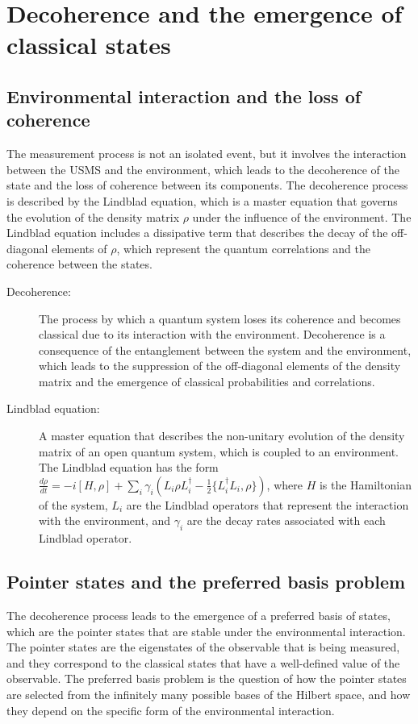 \section{Decoherence and the emergence of classical states}
\subsection{Environmental interaction and the loss of coherence}
The measurement process is not an isolated event, but it involves the interaction between the USMS and the environment, which leads to the decoherence of the state and the loss of coherence between its components. The decoherence process is described by the Lindblad equation, which is a master equation that governs the evolution of the density matrix $\rho$ under the influence of the environment. The Lindblad equation includes a dissipative term that describes the decay of the off-diagonal elements of $\rho$, which represent the quantum correlations and the coherence between the states.

\begin{tcolorbox}[colback=blue!5!white,colframe=blue!75!black,title=New terms]
\begin{description}
\item[Decoherence:] The process by which a quantum system loses its coherence and becomes classical due to its interaction with the environment. Decoherence is a consequence of the entanglement between the system and the environment, which leads to the suppression of the off-diagonal elements of the density matrix and the emergence of classical probabilities and correlations.
\item[Lindblad equation:] A master equation that describes the non-unitary evolution of the density matrix of an open quantum system, which is coupled to an environment. The Lindblad equation has the form $\frac{d\rho}{dt} = -i[H,\rho] + \sum_i \gamma_i (L_i \rho L_i^\dagger - \frac{1}{2}\{L_i^\dagger L_i,\rho\})$, where $H$ is the Hamiltonian of the system, $L_i$ are the Lindblad operators that represent the interaction with the environment, and $\gamma_i$ are the decay rates associated with each Lindblad operator.
\end{description}
\end{tcolorbox}

\subsection{Pointer states and the preferred basis problem}
The decoherence process leads to the emergence of a preferred basis of states, which are the pointer states that are stable under the environmental interaction. The pointer states are the eigenstates of the observable that is being measured, and they correspond to the classical states that have a well-defined value of the observable. The preferred basis problem is the question of how the pointer states are selected from the infinitely many possible bases of the Hilbert space, and how they depend on the specific form of the environmental interaction.

